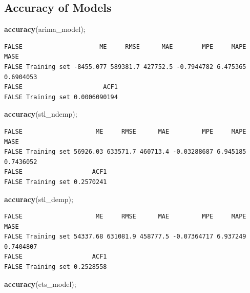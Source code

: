 \documentclass[openany]{book}
\newenvironment{Shaded}{\begin{snugshade}}{\end{snugshade}}
\newcommand{\KeywordTok}[1]{\textcolor[rgb]{0.13,0.29,0.53}{\textbf{#1}}}
\newcommand{\NormalTok}[1]{#1}
\begin{document}
\subsection{Accuracy of Models}\label{accuracy-of-models}

\begin{Shaded}
\begin{Highlighting}[]
\KeywordTok{accuracy}\NormalTok{(arima_model);}
\end{Highlighting}
\end{Shaded}

\begin{verbatim}
FALSE                     ME     RMSE      MAE        MPE     MAPE      MASE
FALSE Training set -8455.077 589381.7 427752.5 -0.7944782 6.475365 0.6904053
FALSE                      ACF1
FALSE Training set 0.0006090194
\end{verbatim}

\begin{Shaded}
\begin{Highlighting}[]
\KeywordTok{accuracy}\NormalTok{(stl_ndemp);}
\end{Highlighting}
\end{Shaded}

\begin{verbatim}
FALSE                    ME     RMSE      MAE         MPE     MAPE      MASE
FALSE Training set 56926.03 633571.7 460713.4 -0.03288687 6.945185 0.7436052
FALSE                   ACF1
FALSE Training set 0.2570241
\end{verbatim}

\begin{Shaded}
\begin{Highlighting}[]
\KeywordTok{accuracy}\NormalTok{(stl_demp);}
\end{Highlighting}
\end{Shaded}

\begin{verbatim}
FALSE                    ME     RMSE      MAE         MPE     MAPE      MASE
FALSE Training set 54337.68 631081.9 458777.5 -0.07364717 6.937249 0.7404807
FALSE                   ACF1
FALSE Training set 0.2528558
\end{verbatim}

\begin{Shaded}
\begin{Highlighting}[]
\KeywordTok{accuracy}\NormalTok{(ets_model);}
\end{Highlighting}
\end{Shaded}
\end{document}
